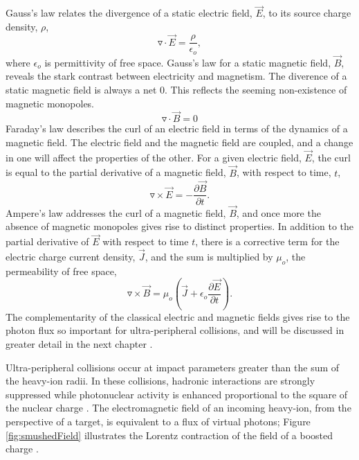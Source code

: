 Gauss's law relates the divergence of a static electric field, $\vec{E}$, to its source charge density, $\rho$,
\begin{equation}
\triangledown\cdot\vec{E}= \frac{\rho}{\epsilon_o},
\end{equation}
where $\epsilon_o$ is permittivity of free space. Gauss's law for a static magnetic field, $\vec{B}$, reveals the stark contrast between electricity and magnetism. The diverence of a static magnetic field is always a net 0. This reflects the seeming non-existence of magnetic monopoles.  
\begin{equation}
\triangledown\cdot\vec{B}=0
\end{equation}
Faraday's law describes the curl of an electric field in terms of the dynamics of a magnetic field. The electric field and the magnetic field are coupled, and a change in one will affect the properties of the other. For a given electric field, $\vec{E}$, the curl is equal to the partial derivative of a magnetic field, $\vec{B}$, with respect to time, $t$,
\begin{equation}
\triangledown\times\vec{E}=-\frac{\partial\vec{B}}{\partial t}.
\end{equation}
Ampere's law addresses the curl of a magnetic field, $\vec{B}$, and once more the absence of magnetic monopoles gives rise to distinct properties. In addition to the partial derivative of $\vec{E}$ with respect to time $t$, there is a corrective term for the electric charge current density, $\vec{J}$, and the sum is multiplied by $\mu_o$, the permeability of free space,
\begin{equation}
\triangledown \times \vec{B} = \mu_o \left(  \vec{J} + \epsilon _{o} \frac{\partial \vec{E}}{\partial t} \right ).
\end{equation}
The complementarity of the classical electric and magnetic fields gives rise to the photon flux so important for ultra-peripheral collisions, and will be discussed in greater detail in the next chapter \cite{griffiths1999introduction}.

Ultra-peripheral collisions occur at impact parameters greater than the sum of the heavy-ion radii. In these collisions, hadronic interactions are strongly suppressed while photonuclear activity is enhanced proportional to the square of the nuclear charge \cite{Contreras:2015dqa}. The electromagnetic field of an incoming heavy-ion, from the perspective of a target, is equivalent to a flux of virtual photons; Figure \ref{fig:smushedField} illustrates the Lorentz contraction of the field of a boosted charge \cite{Baltz:2007kq}\cite{WWJackson}.

